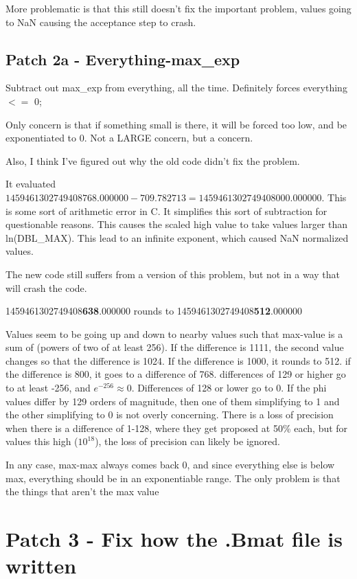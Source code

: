 More problematic is that this still doesn't fix the important problem, values going to NaN causing the acceptance step to crash.


\subsection{Patch 2a - Everything-max\_exp}

Subtract out max\_exp from everything, all the time.
Definitely forces everything $<=$ 0;

Only concern is that if something small is there, it will be forced too low, and be exponentiated to 0. Not a LARGE concern, but a concern.

Also, I think I've figured out why the old code didn't fix the problem.

It evaluated $1459461302749408768.000000 - 709.782713 = 1459461302749408000.000000$. This is some sort of arithmetic error in C. It simplifies this sort of subtraction for questionable reasons. This causes the scaled high value to take values larger than ln(DBL\_MAX). This lead to an infinite exponent, which caused NaN normalized values.

The new code still suffers from a version of this problem, but not in a way that will crash the code. 

1459461302749408\textbf{638}.000000 rounds to
1459461302749408\textbf{512}.000000

Values seem to be going up and down to nearby values such that max-value is a sum of (powers of two of at least 256). If the difference is 1111, the second value changes so that the difference is 1024. If the difference is 1000, it rounds to 512. if the difference is 800, it goes to a difference of 768. differences of 129 or higher go to at least -256, and $e^{-256} \approx 0$. Differences of 128 or lower go to 0.  If the phi values differ by 129 orders of magnitude, then one of them simplifying to 1 and the other simplifying to 0 is not overly concerning. There is a loss of precision when there is a difference of 1-128, where they get proposed at 50\% each, but for values this high ($10^{18}$), the loss of precision can likely be ignored.


In any case, max-max always comes back 0, and since everything else is below max, everything should be in an exponentiable range. The only problem is that the things that aren't the max value 

\section{Patch 3 - Fix how the .Bmat file is written}

